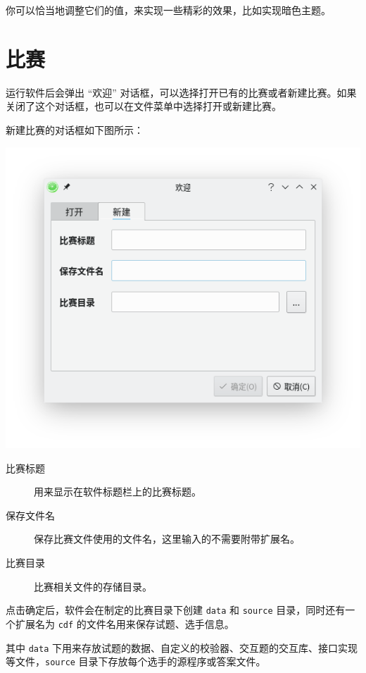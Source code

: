 \documentclass[UTF-8]{ctexart}
\begin{document}
				你可以恰当地调整它们的值，来实现一些精彩的效果，比如实现暗色主题。
				
		\newpage
		
		
		\section{比赛}
		
			运行软件后会弹出 “欢迎” 对话框，可以选择打开已有的比赛或者新建比赛。如果关闭了这个对话框，也可以在文件菜单中选择打开或新建比赛。
			
			新建比赛的对话框如下图所示：
			
			\begin{center}
			\includegraphics[scale=0.7]{pics/newcontest.png}
			\end{center}
			
			\begin{description}
				\item[比赛标题] 用来显示在软件标题栏上的比赛标题。
				\item[保存文件名] 保存比赛文件使用的文件名，这里输入的不需要附带扩展名。
				\item[比赛目录] 比赛相关文件的存储目录。  
			\end{description}
			
			点击确定后，软件会在制定的比赛目录下创建 \texttt{data} 和 \texttt{source} 目录，同时还有一个扩展名为 \texttt{cdf} 的文件名用来保存试题、选手信息。
			
			其中 \texttt{data} 下用来存放试题的数据、自定义的校验器、交互题的交互库、接口实现等文件，\texttt{source} 目录下存放每个选手的源程序或答案文件。
			
\end{document}
